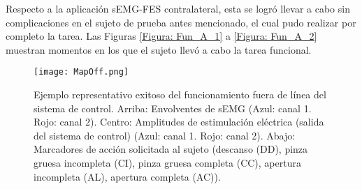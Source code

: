 Respecto a la aplicación sEMG-FES contralateral, esta se logró llevar a cabo sin complicaciones en el sujeto de prueba antes mencionado, el cual pudo realizar por completo la tarea. Las Figuras \ref{Figura: Fun_A_1} a \ref{Figura: Fun_A_2} muestran momentos en los que el sujeto llevó a cabo la tarea funcional.


\begin{figure}[htbp]
	\centering
	\texttt{[image: MapOff.png]}
	\caption[Ejemplo representativo exitoso del funcionamiento fuera de línea del sistema de control]{Ejemplo representativo exitoso del funcionamiento fuera de línea del sistema de control. Arriba: Envolventes de sEMG (Azul: canal 1. Rojo: canal 2). Centro: Amplitudes de estimulación eléctrica (salida del sistema de control) (Azul: canal 1. Rojo: canal 2). Abajo: Marcadores de acción solicitada al sujeto (descanso (DD), pinza gruesa incompleta (CI), pinza gruesa completa (CC), apertura incompleta (AL), apertura completa (AC)).}
	\label{Figura: MapOff}
\end{figure}


